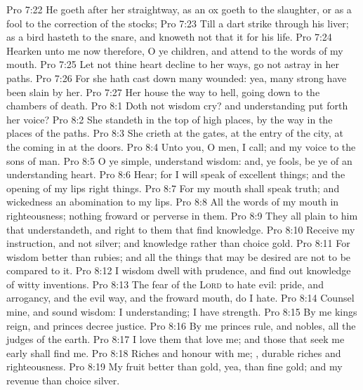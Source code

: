 \vs Pro 7:22 He goeth after her straightway, as an ox goeth to the slaughter, or as a fool to the correction of the stocks;
\vs Pro 7:23 Till a dart strike through his liver; as a bird hasteth to the snare, and knoweth not that it  for his life.
\vs Pro 7:24 Hearken unto me now therefore, O ye children, and attend to the words of my mouth.
\vs Pro 7:25 Let not thine heart decline to her ways, go not astray in her paths.
\vs Pro 7:26 For she hath cast down many wounded: yea, many strong  have been slain by her.
\vs Pro 7:27 Her house  the way to hell, going down to the chambers of death.
\vs Pro 8:1 Doth not wisdom cry? and understanding put forth her voice?
\vs Pro 8:2 She standeth in the top of high places, by the way in the places of the paths.
\vs Pro 8:3 She crieth at the gates, at the entry of the city, at the coming in at the doors.
\vs Pro 8:4 Unto you, O men, I call; and my voice  to the sons of man.
\vs Pro 8:5 O ye simple, understand wisdom: and, ye fools, be ye of an understanding heart.
\vs Pro 8:6 Hear; for I will speak of excellent things; and the opening of my lips  right things.
\vs Pro 8:7 For my mouth shall speak truth; and wickedness  an abomination to my lips.
\vs Pro 8:8 All the words of my mouth  in righteousness;  nothing froward or perverse in them.
\vs Pro 8:9 They  all plain to him that understandeth, and right to them that find knowledge.
\vs Pro 8:10 Receive my instruction, and not silver; and knowledge rather than choice gold.
\vs Pro 8:11 For wisdom  better than rubies; and all the things that may be desired are not to be compared to it.
\vs Pro 8:12 I wisdom dwell with prudence, and find out knowledge of witty inventions.
\vs Pro 8:13 The fear of the \textsc{Lord}  to hate evil: pride, and arrogancy, and the evil way, and the froward mouth, do I hate.
\vs Pro 8:14 Counsel  mine, and sound wisdom: I  understanding; I have strength.
\vs Pro 8:15 By me kings reign, and princes decree justice.
\vs Pro 8:16 By me princes rule, and nobles,  all the judges of the earth.
\vs Pro 8:17 I love them that love me; and those that seek me early shall find me.
\vs Pro 8:18 Riches and honour  with me; , durable riches and righteousness.
\vs Pro 8:19 My fruit  better than gold, yea, than fine gold; and my revenue than choice silver.

